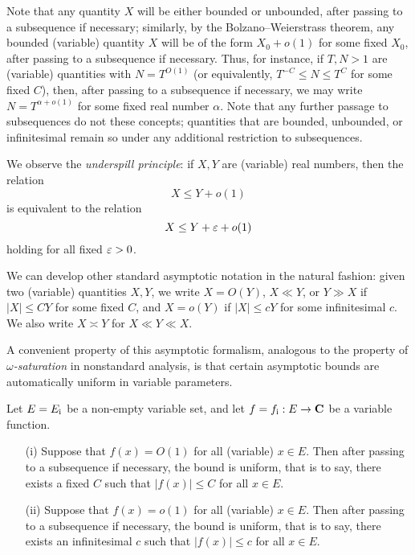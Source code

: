 Note that any quantity $X$ will be either bounded or unbounded, after passing to a subsequence if necessary; similarly, by the Bolzano--Weierstrass theorem, any bounded (variable) quantity $X$ will be of the form $X_0+o(1)$ for some fixed $X_0$, after passing to a subsequence if necessary.  Thus, for instance, if $T, N > 1$ are (variable) quantities with $N = T^{O(1)}$ (or equivalently, $T^{-C} \leq N \leq T^C$ for some fixed $C$), then, after passing to a subsequence if necessary, we may write $N = T^{\alpha+o(1)}$ for some fixed real number $\alpha$.  Note that any further passage to subsequences do not these concepts; quantities that are bounded, unbounded, or infinitesimal remain so under any additional restriction to subsequences.

We observe the \emph{underspill principle}: if $X,Y$ are (variable) real numbers, then the relation
$$ X \leq Y + o(1)$$
is equivalent to the relation
$$ X \leq Y + \varepsilon + o(1)$$
holding for all fixed $\varepsilon>0$.

We can develop other standard asymptotic notation in the natural fashion: given two (variable) quantities $X,Y$, we write $X = O(Y)$, $X \ll Y$, or $Y \gg X$ if $|X| \leq CY$ for some fixed $C$, and $X = o(Y)$ if $|X| \leq cY$ for some infinitesimal $c$.  We also write $X \asymp Y$ for $X \ll Y \ll X$.

A convenient property of this asymptotic formalism, analogous to the property of \emph{$\omega$-saturation} in nonstandard analysis, is that certain asymptotic bounds are automatically uniform in variable parameters.

\begin{proposition}\label{auto}  Let $E = E_{{\mathrm{i}}}$ be a non-empty variable set, and let $f = f_{{\mathrm{i}}}: E \to \mathbf{C}$ be a variable function.  \begin{itemize}
    \item[(i)] Suppose that $f(x)=O(1)$ for all (variable) $x \in E$.  Then after passing to a subsequence if necessary, the bound is uniform, that is to say, there exists a fixed $C$ such that $|f(x)| \leq C$ for all $x \in E$.
    \item[(ii)] Suppose that $f(x)=o(1)$ for all (variable) $x \in E$.  Then after passing to a subsequence if necessary, the bound is uniform, that is to say, there exists an infinitesimal $c$ such that $|f(x)| \leq c$ for all $x \in E$.
\end{itemize}
\end{proposition}


